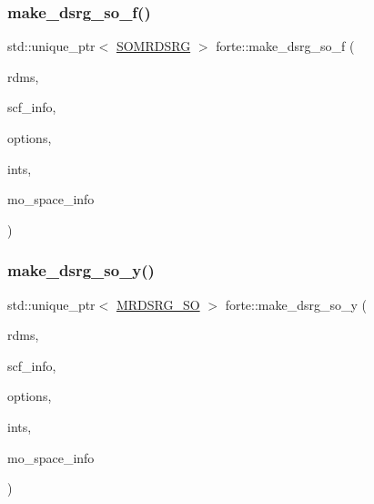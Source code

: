 \subsubsection{\texorpdfstring{make\+\_\+dsrg\+\_\+so\+\_\+f()}{make\_dsrg\_so\_f()}}
{\footnotesize\ttfamily std\+::unique\+\_\+ptr$<$ \mbox{\hyperlink{classforte_1_1_s_o_m_r_d_s_r_g}{S\+O\+M\+R\+D\+S\+RG}} $>$ forte\+::make\+\_\+dsrg\+\_\+so\+\_\+f (\begin{DoxyParamCaption}\item[{\mbox{\hyperlink{classforte_1_1_r_d_ms}{R\+D\+Ms}}}]{rdms,  }\item[{std\+::shared\+\_\+ptr$<$ \mbox{\hyperlink{classforte_1_1_s_c_f_info}{S\+C\+F\+Info}} $>$}]{scf\+\_\+info,  }\item[{std\+::shared\+\_\+ptr$<$ \mbox{\hyperlink{classforte_1_1_forte_options}{Forte\+Options}} $>$}]{options,  }\item[{std\+::shared\+\_\+ptr$<$ \mbox{\hyperlink{classforte_1_1_forte_integrals}{Forte\+Integrals}} $>$}]{ints,  }\item[{std\+::shared\+\_\+ptr$<$ \mbox{\hyperlink{classforte_1_1_m_o_space_info}{M\+O\+Space\+Info}} $>$}]{mo\+\_\+space\+\_\+info }\end{DoxyParamCaption})}

\mbox{\label{namespaceforte_a6aeb5b4097c58f20e18681ab1e98d13d}} 
\subsubsection{\texorpdfstring{make\+\_\+dsrg\+\_\+so\+\_\+y()}{make\_dsrg\_so\_y()}}
{\footnotesize\ttfamily std\+::unique\+\_\+ptr$<$ \mbox{\hyperlink{classforte_1_1_m_r_d_s_r_g___s_o}{M\+R\+D\+S\+R\+G\+\_\+\+SO}} $>$ forte\+::make\+\_\+dsrg\+\_\+so\+\_\+y (\begin{DoxyParamCaption}\item[{\mbox{\hyperlink{classforte_1_1_r_d_ms}{R\+D\+Ms}}}]{rdms,  }\item[{std\+::shared\+\_\+ptr$<$ \mbox{\hyperlink{classforte_1_1_s_c_f_info}{S\+C\+F\+Info}} $>$}]{scf\+\_\+info,  }\item[{std\+::shared\+\_\+ptr$<$ \mbox{\hyperlink{classforte_1_1_forte_options}{Forte\+Options}} $>$}]{options,  }\item[{std\+::shared\+\_\+ptr$<$ \mbox{\hyperlink{classforte_1_1_forte_integrals}{Forte\+Integrals}} $>$}]{ints,  }\item[{std\+::shared\+\_\+ptr$<$ \mbox{\hyperlink{classforte_1_1_m_o_space_info}{M\+O\+Space\+Info}} $>$}]{mo\+\_\+space\+\_\+info }\end{DoxyParamCaption})}

